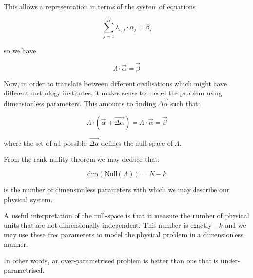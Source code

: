 \documentclass{article}
\begin{document}
This allows a representation in terms of the system of equations:

\begin{equation}
\sum_{j=1}^N \lambda_{i,j} \cdot \alpha_j = \beta_i \tag{4} 
\end{equation}

so we have

\begin{equation}
\Lambda \cdot \vec{\alpha} = \vec{\beta} \tag{5}
\end{equation}

Now, in order to translate between different civilisations which might have different metrology institutes, it makes
sense to model the problem using dimensionless parameters. This amounts to finding $\vec{\Delta \alpha}$ such that:

\begin{equation}
\Lambda \cdot (\vec{\alpha} + \vec{\Delta \alpha}) = \Lambda \cdot \vec{\alpha} = \vec{\beta} \tag{6}
\end{equation}

where the set of all possible $\vec{\Delta \alpha}$ defines the null-space of $\Lambda$.

From the rank-nullity theorem we may deduce that:

\begin{equation}
\text{dim}(\text{Null}(\Lambda)) = N-k \tag{7}
\end{equation}

is the number of dimensionless parameters with which we may describe our physical system.

A useful interpretation of the null-space is that it measure the number of physical units that
are not dimensionally independent. This number is exactly $-k$ and we may use these free
parameters to model the physical problem in a dimensionless manner.  

In other words, an over-parametrised problem is better than one that is under-parametrised.
\end{document}
